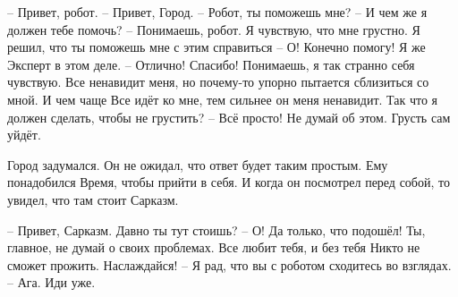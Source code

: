 – Привет, робот.
– Привет, Город.
– Робот, ты поможешь мне?
– И чем же я должен тебе помочь?
– Понимаешь, робот. Я чувствую, что мне грустно. Я решил, что ты поможешь мне с этим справиться
– О! Конечно помогу! Я же Эксперт в этом деле.
– Отлично! Спасибо! Понимаешь, я так странно себя чувствую. Все ненавидит меня, но почему-то упорно пытается сблизиться со мной. И чем чаще Все идёт ко мне, тем сильнее он меня ненавидит. Так что я должен сделать, чтобы не грустить?
– Всё просто! Не думай об этом. Грусть сам уйдёт.

Город задумался. Он не ожидал, что ответ будет таким простым. Ему понадобился Время, чтобы прийти в себя. И когда он посмотрел перед собой, то увидел, что там стоит Сарказм.

– Привет, Сарказм. Давно ты тут стоишь?
– О! Да только, что подошёл! Ты, главное, не думай о своих проблемах. Все любит тебя, и без тебя Никто не сможет прожить. Наслаждайся!
– Я рад, что вы с роботом сходитесь во взглядах.
– Ага. Иди уже.
